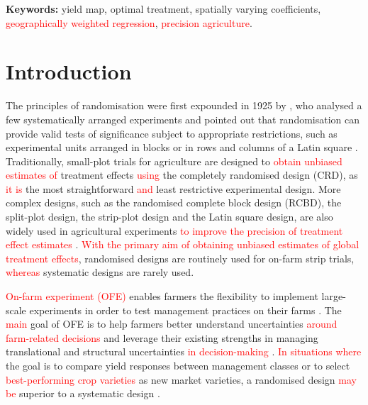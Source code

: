 \documentclass[a4paper]{article} 	%
\newcommand{\revision}[1]{\textcolor{red}{#1}}
\begin{document}
 
{\bf Keywords:} yield map, optimal treatment, spatially varying coefficients, \revision{geographically weighted regression}, \revision{precision agriculture}. 

\section{Introduction}\label{Sec:Intro}

The principles of randomisation were first expounded in 1925 by \textcite{Fisher1934Statistical}, who analysed a few systematically arranged experiments and pointed out that randomisation can provide valid tests of significance subject to appropriate restrictions, such as experimental units arranged in blocks or in rows and columns of a Latin square \parencite{Verdooren2020History}. Traditionally, small-plot trials for agriculture are designed to \revision{obtain unbiased estimates of} treatment effects \revision{using} the completely randomised design (CRD), as \revision{it is} the most straightforward \revision{and} least restrictive experimental design. More complex designs, such as the randomised complete block design (RCBD), the split-plot design, the strip-plot design and the Latin square design, are also widely used in agricultural experiments \revision{to improve the precision of treatment effect estimates} \parencite{Petersen1994Agricultural}. \revision{With the primary aim of obtaining unbiased estimates of global treatment effects}, randomised designs are routinely used for on-farm strip trials, \revision{whereas} systematic designs are rarely used.



\revision{On-farm experiment (OFE)} enables farmers the flexibility to implement large-scale experiments in order to test management practices on their farms \parencite{Evans2020Assessment}. The \revision{main} goal of OFE is to help farmers better understand uncertainties \revision{around farm-related decisions} and leverage their existing strengths in managing translational and structural uncertainties \revision{in decision-making} \parencite{Cook2013Onfarm}. \revision{In situations where} the goal is to compare yield responses between management classes or to select \revision{best-performing crop varieties} as new market varieties, a randomised design \revision{may be} superior to a systematic design \parencite{Pringle2004FieldScale, Selle2019Flexible}. 
\end{document}
